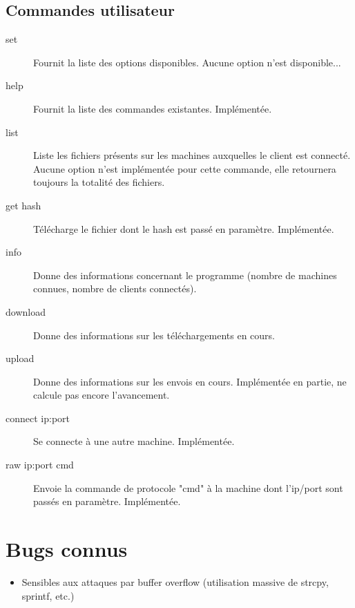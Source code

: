 \subsection{Commandes utilisateur}
\begin{description}

    \item[set] Fournit la liste des options disponibles. Aucune option n'est
    disponible...

    \item[help] Fournit la liste des commandes existantes. Implémentée.

    \item[list] Liste les fichiers présents sur les machines auxquelles le
    client est connecté. Aucune option n'est implémentée pour cette commande,
    elle retournera toujours la totalité des fichiers.

    \item[get hash] Télécharge le fichier dont le hash est passé en paramètre.
    Implémentée.

    \item[info] Donne des informations concernant le programme (nombre de
    machines connues, nombre de clients connectés).

    \item[download] Donne des informations sur les téléchargements en cours.

    \item[upload] Donne des informations sur les envois en cours. Implémentée
    en partie, ne calcule pas encore l'avancement.

    \item[connect ip:port] Se connecte à une autre machine. Implémentée.

    \item[raw ip:port cmd] Envoie la commande de protocole "cmd" à la machine
    dont l'ip/port sont passés en paramètre. Implémentée.

\end{description}

\section{Bugs connus}
\begin{itemize}
    \item Sensibles aux attaques par buffer overflow (utilisation massive de
strcpy, sprintf, etc.)
\end{itemize}
